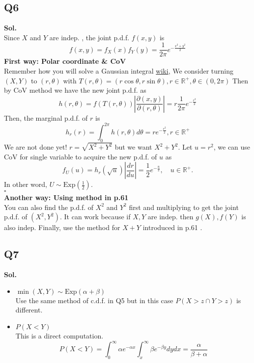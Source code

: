 \documentclass[12pt]{article}
\begin{document}
\subsection*{Q6}
\textbf{Sol.} \\
Since \(X\) and \(Y\) are indep. , the joint p.d.f. \(f(x,y)\) is 
\[
   f(x,y) = f_X(x)f_{Y} (y) = \frac{1}{2\pi } e^{-\frac{x^{2} +y^{2}  }{2}}
\] 
\textbf{First way: Polar coordinate \& CoV} \\
Remember how you will solve a Gaussian integral \href{https://en.wikipedia.org/wiki/Gaussian_integral#By_polar_coordinates}{wiki}, 
We consider turning \((X,Y)\) to \((r,\theta )\) with \(T(r,\theta ) = (r\cos{\theta },r\sin{\theta} ), r \in \mathbb{R}^+, \theta \in (0,2\pi )\)  
Then by CoV method we have the new joint p.d.f. as 
\[
   h(r,\theta ) = f(T(r,\theta )) \left\vert \frac{\partial (x,y)}{\partial (r,\theta )} \right\vert  = r\frac{1}{2\pi } e^{-\frac{r^{2} }{2}}
\]
Then, the marginal p.d.f. of \(r\) is 
\[
   h_r(r) = \int_0^{2\pi }h(r,\theta ) d \theta  = r e^{-\frac{r^{2}}{2} }, r \in \mathbb{R}^+
\]
We are not done yet! \(r = \sqrt{X^2 + Y^{2} } \) but we want \(X^{2}  + Y^{2} \). Let \(u = r^2\), we can use CoV for single variable to acquire the new p.d.f. of \(u\) as 
\[
  f_U(u) = h_r(\sqrt{u}) \left\vert \frac{d r}{du} \right\vert  = \frac{1}{2}e^{-\frac{u}{2}}, \quad u \in \mathbb{R}^+.  
\]
In other word, \(U \sim \text{Exp}(\frac{1}{2})\). 
\\ \hspace{\textwidth}\(\square\)      
\\
\textbf{Another way: Using method in p.61}\\
You can also find the p.d.f. of \(X^2\) and \(Y^2\) first and multiplying to get the joint p.d.f. of \((X^2, Y^2)\). It can work because if \(X,Y\) are indep. then \(g(X), f(Y)\) is also indep.
Finally, use the method for \(X + Y\) introduced in p.61 . 


\subsection*{Q7}
\textbf{Sol.} \\
\begin{itemize}
    \item \(\min{(X,Y)} \sim \text{Exp}(\alpha +\beta )\) \\ 
    Use the same method of c.d.f. in Q5 but in this case \(P(X > z \cap Y > z)\) is different. 
    \item \(P(X < Y)\)\\  
    This is a direct computation. 
    \[
      P(X < Y) = \int_0^{\infty} \alpha e^{-\alpha  x}\int_x^{\infty}  \beta  e^{- \beta y} dydx = \frac{\alpha }{\beta + \alpha } 
    \]
\end{itemize}
\end{document}
